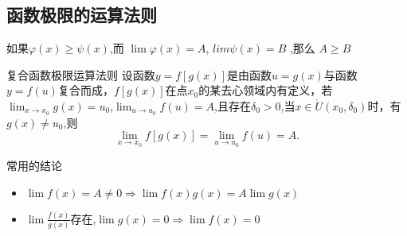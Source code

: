 \documentclass[12pt, a4paper, oneside, UTF8]{ctexbook}
\begin{document}
\begin{sloppypar}
    \subsection{函数极限的运算法则}
    \begin{defn}{}{}
        如果$\varphi(x)\geqslant\psi(x)$,而 $\lim\varphi(x)=A$, $lim \psi(x)=B$ ,那么 $A\geqslant B$
    \end{defn}
    \begin{defn}{复合函数极限运算法则}{}
        设函数$y=f[g(x)]$是由函数$u=g(x)$与函数$y=f(u)$复合而成，$f[g(x)]$在点$x_0$的某去心领域内有定义，若$\lim_{x \to  x_0} g(x)=u_0$,$\lim_{u \to u_0}f(u)=A$,且存在$\delta_0 >0$,当$x\in\mathring{U}\left(x_{0},\delta_{0}\right)$时，有$g\left(x\right)\neq u_{0}$,则
        $$
            \underset{x\to x_0}{\operatorname*{lim}}f[g(x)]=\underset{u\to u_0}{\operatorname*{lim}}f(u)=A.
        $$
    \end{defn}
    \begin{criterion}{常用的结论}{}
        \begin{itemize}
            \item $\lim f(x)=A \neq 0 \Rightarrow \lim f(x)g(x)=A \lim g(x)$
            \item $\lim \frac{f(x)}{g(x)}$存在,$\lim g(x)=0 \Rightarrow \lim f(x)=0$
        \end{itemize}
    \end{criterion}

\end{sloppypar}
\end{document}
